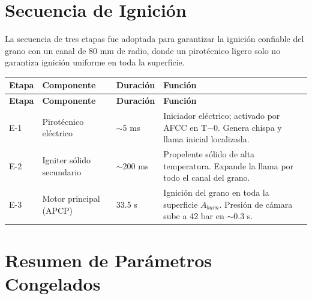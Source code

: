 \documentclass[11pt, a4paper]{article}
\begin{document}
\section{Secuencia de Ignici\'{o}n}

La secuencia de tres etapas fue adoptada para garantizar la ignici\'{o}n confiable del grano con un canal de 80 mm de radio, donde un pirot\'{e}cnico ligero solo no garantiza ignici\'{o}n uniforme en toda la superficie.

\begin{longtable}{C{1cm} L{3.5cm} C{2cm} L{7cm}}
  \color{white}\textbf{Etapa} &
  \color{white}\textbf{Componente} &
  \color{white}\textbf{Duraci\'{o}n} &
  \color{white}\textbf{Funci\'{o}n} \\
  \endfirsthead
  \color{white}\textbf{Etapa} &
  \color{white}\textbf{Componente} &
  \color{white}\textbf{Duraci\'{o}n} &
  \color{white}\textbf{Funci\'{o}n} \\
  \endhead
  E-1 & Pirot\'{e}cnico el\'{e}ctrico & $\sim$5 ms & Iniciador el\'{e}ctrico; activado por AFCC en T$-$0. Genera chispa y llama inicial localizada. \\
  E-2 & Igniter s\'{o}lido secundario & $\sim$200 ms & Propelente s\'{o}lido de alta temperatura. Expande la llama por todo el canal del grano. \\
  E-3 & Motor principal (APCP) & 33.5 s & Ignici\'{o}n del grano en toda la superficie $A_{burn}$. Presi\'{o}n de c\'{a}mara sube a 42 bar en $\sim$0.3 s. \\
\end{longtable}

\section{Resumen de Par\'{a}metros Congelados}
\end{document}
